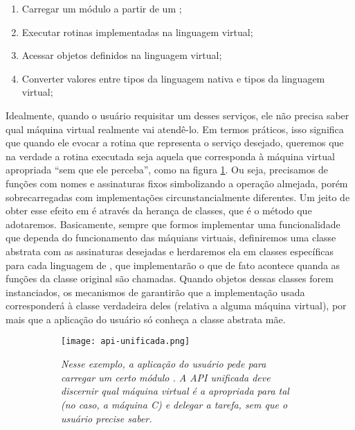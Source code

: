     \begin{enumerate}
      \item Carregar um módulo a partir de um \script{};
      \item Executar rotinas implementadas na linguagem virtual;
      \item Acessar objetos definidos na linguagem virtual;
      \item Converter valores entre tipos da linguagem nativa e tipos da
            linguagem virtual;
    \end{enumerate}

    Idealmente, quando o usuário requisitar um desses serviços, ele não precisa
    saber qual máquina virtual realmente vai atendê-lo. Em termos práticos, isso
    significa que quando ele evocar a rotina que representa o serviço desejado,
    queremos que na verdade a rotina executada seja aquela que corresponda à
    máquina virtual apropriada ``sem que ele perceba'', como na figura
    \ref{fig:api-unificada}. Ou seja, precisamos de funções com nomes e
    assinaturas\footnotemark{} fixos simbolizando a operação almejada, porém
    sobrecarregadas com implementações circunstancialmente diferentes. Um jeito
    de obter esse efeito em \CXX{} é através da herança de classes, que é o
    método que adotaremos. Basicamente, sempre que formos implementar uma
    funcionalidade que dependa do funcionamento das máquians virtuais,
    definiremos uma classe abstrata com as assinaturas desejadas e herdaremos
    ela em classes específicas para cada linguagem de \script{}, que
    implementarão o que de fato acontece quanda as funções da classe original
    são chamadas. Quando objetos dessas classes forem instanciados, os
    mecanismos de \CXX{} garantirão que a implementação usada corresponderá à
    classe verdadeira deles (relativa a alguma máquina virtual), por mais que a
    aplicação do usuário só conheça a classe abstrata mãe.


    \begin{figure}[ht]
      \centering
      \caption{}
      \begin{subfigure}{.8\textwidth}
        \begin{center}
          \texttt{[image: api-unificada.png]}
          \vspace{1em}

          \textit{
            Nesse exemplo, a aplicação do usuário pede para carregar um certo
            módulo \script{}. A API unificada deve discernir qual máquina virtual
            é a apropriada para tal (no caso, a máquina C) e delegar a tarefa, sem
            que o usuário precise saber.
          }
        \end{center}
      \end{subfigure}
      \label{fig:api-unificada}
    \end{figure}

